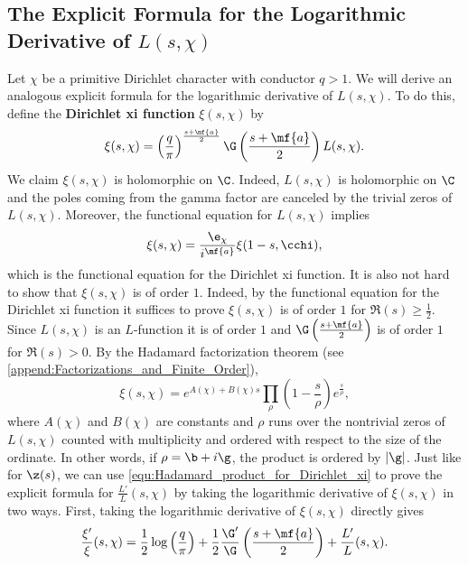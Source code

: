     \subsection*{The Explicit Formula for the Logarithmic Derivative of \texorpdfstring{$L(s,\chi)$}{L(s,\chi)}}
      Let $\chi$ be a primitive Dirichlet character with conductor $q > 1$. We will derive an analogous explicit formula for the logarithmic derivative of $L(s,\chi)$. To do this, define the \textbf{Dirichlet xi function} $\xi(s,\chi)$ by
      \[
        \xi(s,\chi) = \left(\frac{q}{\pi}\right)^{\frac{s+\mf{a}}{2}}\G\left(\frac{s+\mf{a}}{2}\right)L(s,\chi).
      \]
      We claim $\xi(s,\chi)$ is holomorphic on $\C$. Indeed, $L(s,\chi)$ is holomorphic on $\C$ and the poles coming from the gamma factor are canceled by the trivial zeros of $L(s,\chi)$. Moreover, the functional equation for $L(s,\chi)$ implies
      \[
        \xi(s,\chi) = \frac{\e_{\chi}}{i^{\mf{a}}}\xi(1-s,\cchi),
      \]
      which is the functional equation for the Dirichlet xi function. It is also not hard to show that $\xi(s,\chi)$ is of order $1$. Indeed, by the functional equation for the Dirichlet xi function it suffices to prove $\xi(s,\chi)$ is of order $1$ for $\Re(s) \ge \frac{1}{2}$. Since $L(s,\chi)$ is an $L$-function it is of order $1$ and $\G\left(\frac{s+\mf{a}}{2}\right)$ is of order $1$ for $\Re(s) > 0$. By the Hadamard factorization theorem (see \cref{append:Factorizations_and_Finite_Order}),
      \begin{equation}\label{equ:Hadamard_product_for_Dirichlet_xi}
        \xi(s,\chi) = e^{A(\chi)+B(\chi)s}\prod_{\rho}\left(1-\frac{s}{\rho}\right)e^{\frac{s}{\rho}},
      \end{equation}
      where $A(\chi)$ and $B(\chi)$ are constants and $\rho$ runs over the nontrivial zeros of $L(s,\chi)$ counted with multiplicity and ordered with respect to the size of the ordinate. In other words, if $\rho = \b+i\g$, the product is ordered by $|\g|$. Just like for $\z(s)$, we can use \cref{equ:Hadamard_product_for_Dirichlet_xi} to prove the explicit formula for $\frac{L'}{L}(s,\chi)$ by taking the logarithmic derivative of $\xi(s,\chi)$ in two ways. First, taking the logarithmic derivative of $\xi(s,\chi)$ directly gives
      \begin{equation}\label{equ:logarithmic_derivative_Dirichlet_xi_1}
        \frac{\xi'}{\xi}(s,\chi) = \frac{1}{2}\log\left(\frac{q}{\pi}\right)+\frac{1}{2}\frac{\G'}{\G}\left(\frac{s+\mf{a}}{2}\right)+\frac{L'}{L}(s,\chi).
      \end{equation}

